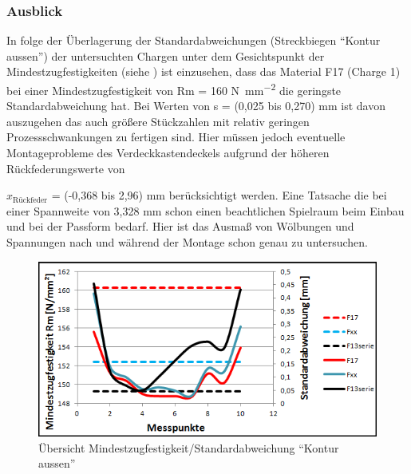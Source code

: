 \documentclass[12pt,a4paper,parskip]{scrartcl}
\begin{document}
\subsubsection{Ausblick}
In folge der Überlagerung der Standardabweichungen (Streckbiegen "`Kontur aussen"') der untersuchten Chargen unter dem Gesichtspunkt der Mindestzugfestigkeiten (siehe ) ist einzusehen, dass das Material F17 (Charge 1) bei einer Mindestzugfestigkeit von Rm = 160  \si{\newton\per\milli\meter\squared}  die geringste Standardabweichung hat. Bei Werten von s = (0,025  bis 0,270) \si{\milli\meter}  ist davon auszugehen das auch größere Stückzahlen mit relativ geringen Prozessschwankungen zu fertigen sind. Hier müssen jedoch eventuelle Montageprobleme des Verdeckkastendeckels aufgrund der höheren Rückfederungswerte von {$x_{\text{Rückfeder}}$ = (-0,368  bis 2,96) \si{\milli\meter} berücksichtigt werden. Eine Tatsache die bei einer Spannweite von 3,328 \si{\milli\meter} schon einen beachtlichen Spielraum beim Einbau und bei der Passform bedarf.  %
Hier ist das Ausmaß von Wölbungen und Spannungen nach und während der Montage schon genau zu untersuchen.

\begin{figure}[!h]
\centering
\includegraphics[width=1\linewidth,height=.3\textheight]{standzugrel}
\caption{Übersicht Mindestzugfestigkeit/Standardabweichung "`Kontur aussen"'}
\label{fig:standzugrel}
\end{figure} 

}
\end{document}
